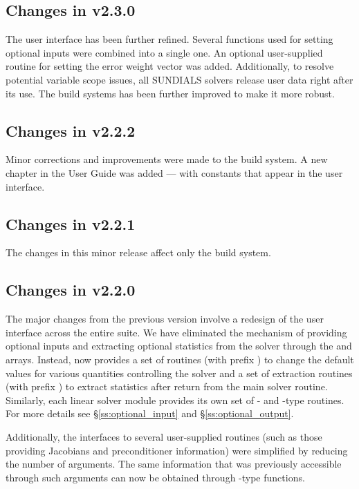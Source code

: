 \subsection*{Changes in v2.3.0}

The user interface has been further refined. Several functions used
for setting optional inputs were combined into a single one.
An optional user-supplied routine for setting the error weight
vector was added.
Additionally, to resolve potential variable scope issues, all
SUNDIALS solvers release user data right after its use. The build
systems has been further improved to make it more robust.

\subsection*{Changes in v2.2.2}

Minor corrections and improvements were made to the build system.
A new chapter in the User Guide was added --- with constants that
appear in the user interface.

\subsection*{Changes in v2.2.1}

The changes in this minor {\sundials} release affect only the build system.

\subsection*{Changes in v2.2.0}

The major changes from the previous version involve a redesign of the
user interface across the entire {\sundials} suite. We have eliminated the
mechanism of providing optional inputs and extracting optional statistics 
from the solver through the  and  arrays. Instead,
{\ida} now provides a set of routines (with prefix )
to change the default values for various quantities controlling the
solver and a set of extraction routines (with prefix )
to extract statistics after return from the main solver routine.
Similarly, each linear solver module provides its own set of {-}
and {-type} routines. For more details see \S\ref{ss:optional_input}
and \S\ref{ss:optional_output}.

Additionally, the interfaces to several user-supplied routines
(such as those providing Jacobians and preconditioner information) 
were simplified by reducing the number
of arguments. The same information that was previously accessible
through such arguments can now be obtained through {-type}
functions.

